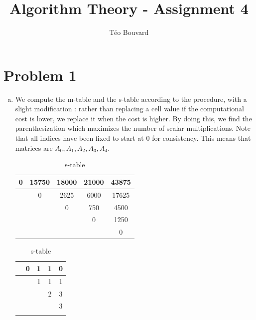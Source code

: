 \documentclass[a4paper, 10pt, twoside]{article}
\begin{document}
\title{Algorithm Theory - Assignment 4}
\author{T\'eo Bouvard}
\maketitle

\section*{Problem 1}
\begin{enumerate}[a)]
	\item We compute the m-table and the s-table according to the  procedure, with a slight modification : rather than replacing a cell value if the computational cost is lower, we replace it when the cost is higher. By doing this, we find the parenthesization  which maximizes the number of scalar multiplications. Note that all indices have been fixed to start at 0 for consistency. This means that matrices are $A_0, A_1, A_2, A_3, A_4$.

	      \begin{table}[htb]
		      \begin{minipage}{.66\textwidth}
			      \centering
			      \caption{m-table}
			      \begin{tabular}{|c|c|c|c|c|}
				      \hline
				      0 & 15750 & 18000 & 21000 & 43875 \\ \hline
				        & 0     & 2625  & 6000  & 17625 \\ \hline
				        &       & 0     & 750   & 4500  \\ \hline
				        &       &       & 0     & 1250  \\ \hline
				        &       &       &       & 0     \\ \hline
			      \end{tabular}
		      \end{minipage}
		      \begin{minipage}{.33\textwidth}
			      \centering
			      \caption{s-table}
			      \begin{tabular}{|c|c|c|c|c|}
				      \hline
				       & 0 & 1 & 1 & 0 \\ \hline
				       &   & 1 & 1 & 1 \\ \hline
				       &   &   & 2 & 3 \\ \hline
				       &   &   &   & 3 \\ \hline
				       &   &   &   &   \\ \hline
			      \end{tabular}
		      \end{minipage}
	      \end{table}


\end{enumerate}
\end{document}

